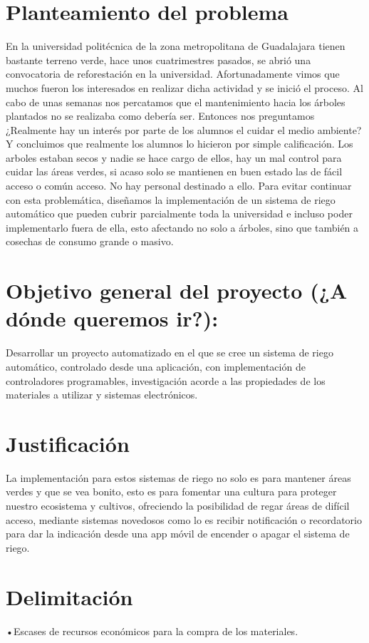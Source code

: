 \documentclass[a4paper,11pt,titlepage]{article}
\begin{document}
\begin{titlepage}
\section{Planteamiento del problema}
En la universidad politécnica de la zona metropolitana de Guadalajara tienen bastante terreno
verde, hace unos cuatrimestres pasados, se abrió una convocatoria de reforestación en la
universidad. Afortunadamente vimos que muchos fueron los interesados en realizar dicha
actividad y se inició el proceso. Al cabo de unas semanas nos percatamos que el mantenimiento
hacia los árboles plantados no se realizaba como debería ser.
Entonces nos preguntamos ¿Realmente hay un interés por parte de los alumnos el cuidar el medio
ambiente? Y concluimos que realmente los alumnos lo hicieron por simple calificación. Los arboles
estaban secos y nadie se hace cargo de ellos, hay un mal control para cuidar las áreas verdes, si
acaso solo se mantienen en buen estado las de fácil acceso o común acceso. No hay personal
destinado a ello. Para evitar continuar con esta problemática, diseñamos la implementación de un
sistema de riego automático que pueden cubrir
parcialmente toda la universidad e incluso poder implementarlo fuera de ella, esto afectando no
solo a árboles, sino que también a cosechas de consumo grande o masivo.

\section{Objetivo general del proyecto (¿A dónde queremos ir?):}
Desarrollar un proyecto automatizado en el que se cree un sistema de riego automático,
controlado desde una aplicación, con implementación de controladores programables,
investigación acorde a las propiedades de los materiales a utilizar y sistemas electrónicos.

\section{Justificación}
La implementación para estos sistemas de riego no solo es para mantener áreas verdes y que se
vea bonito, esto es para fomentar una cultura para proteger nuestro ecosistema y cultivos,
ofreciendo la posibilidad de regar áreas de difícil acceso, mediante sistemas novedosos como lo es
recibir notificación o recordatorio para dar la indicación desde una app móvil de encender o
apagar el sistema de riego.

\section{Delimitación}
•Escases de recursos económicos para la compra de los materiales.


\end{titlepage}
\end{document}
